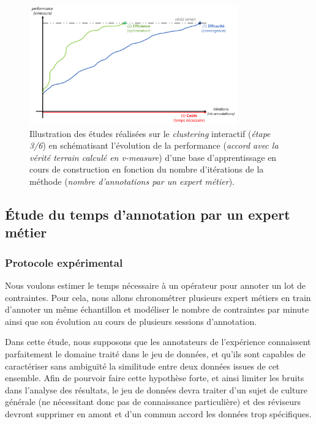 \begin{tcolorbox}[
		title=\faVial~\textbf{Hypothèse sur les coûts}~\faVial,
		colback=colorTcolorboxHypothesis!15,
		colframe=colorTcolorboxHypothesis!75,
		width=\linewidth
	]
		\begin{figure}[H]  %
			\centering
			\includegraphics[width=0.8\textwidth]{figures/hypotheses-03-couts}
			\caption{Illustration des études réalisées sur le \textit{clustering} interactif (\textit{étape 3/6}) en schématisant l'évolution de la performance (\textit{accord avec la vérité terrain calculé en v-measure}) d'une base d'apprentissage en cours de construction en fonction du nombre d'itérations de la méthode (\textit{nombre d'annotations par un expert métier}).}
			\label{figure:4.3-HYPOTHESE-COUTS}
		\end{figure}

	\end{tcolorbox}
	
	
	\subsection{Étude du temps d'annotation par un expert métier}
	\label{section:4.3.1-ETUDE-COUTS-TEMPS-ANNOTATION}
	
		\subsubsection{Protocole expérimental}
		
			Nous voulons estimer le temps nécessaire à un opérateur pour annoter un lot de contraintes.
			Pour cela, nous allons chronométrer plusieurs expert métiers en train d'annoter un même échantillon et modéliser le nombre de contraintes par minute ainsi que son évolution au cours de plusieurs sessions d'annotation.
			
			\begin{leftBarWarning}
				Dans cette étude, nous supposons que les annotateurs de l'expérience connaissent parfaitement le domaine traité dans le jeu de données, et qu'ils sont capables de caractériser sans ambiguïté la similitude entre deux données issues de cet ensemble.
				Afin de pourvoir faire cette hypothèse forte, et ainsi limiter les bruits dans l'analyse des résultats, le jeu de données devra traiter d'un sujet de culture générale (ne nécessitant donc pas de connaissance particulière) et des réviseurs devront supprimer en amont et d'un commun accord les données trop spécifiques.
			\end{leftBarWarning}
			
